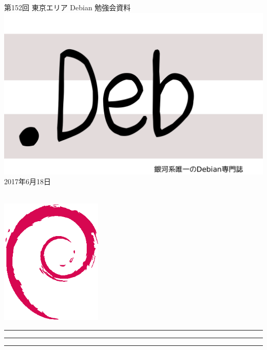 \documentclass[mingoth,a4paper]{jsarticle}
\newcommand{\debmtgyear}{2017}
\newcommand{\debmtgmonth}{6}
\newcommand{\debmtgdate}{18}
\newcommand{\debmtgnumber}{152}
\begin{document}
\begin{titlepage}
\thispagestyle{empty}

\vspace*{-2cm}
第\debmtgnumber{}回 東京エリア Debian 勉強会資料\\
\hspace*{-2cm}
\includegraphics{image2012-natsu/dotdeb.pdf}\\
\hfill{}\debmtgyear{}年\debmtgmonth{}月\debmtgdate{}日

\\

\vspace*{-2cm}
\hfill{}\includegraphics[height=6cm]{image200502/openlogo-nd.eps}
\end{titlepage}

\newpage

\begin{minipage}[b]{0.2\hsize}
 \colorbox{titleback}{}
\end{minipage}
\begin{minipage}[b]{0.8\hsize}
\hrule
\vspace{2mm}
\hrule
\begin{multicols}{2}
\tableofcontents
\end{multicols}
\vspace{2mm}
\hrule
\end{minipage}
\end{document}
